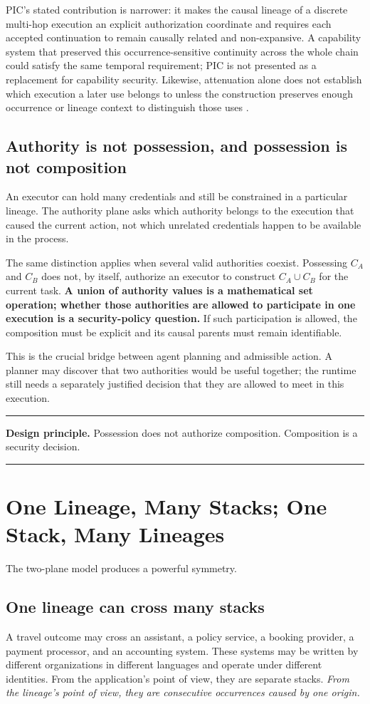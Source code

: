 \documentclass[10pt,oneside,openany]{book}
\newcommand{\principle}[1]{%
  \vspace{4pt}
  \noindent\begin{minipage}{\linewidth}
  \hrule\vspace{5pt}
  \small\sffamily\raggedright\textbf{Design principle.} #1
  \vspace{5pt}\hrule
  \end{minipage}\vspace{4pt}
}
\begin{document}
PIC's stated contribution is narrower: it makes the causal lineage of a discrete multi-hop execution an explicit authorization coordinate and requires each accepted continuation to remain causally related and non-expansive. A capability system that preserved this occurrence-sensitive continuity across the whole chain could satisfy the same temporal requirement; PIC is not presented as a replacement for capability security. Likewise, attenuation alone does not establish which execution a later use belongs to unless the construction preserves enough occurrence or lineage context to distinguish those uses \cite{gallo2026pic}.

\section{Authority is not possession, and possession is not composition}
An executor can hold many credentials and still be constrained in a particular lineage. The authority plane asks which authority belongs to the execution that caused the current action, not which unrelated credentials happen to be available in the process.

The same distinction applies when several valid authorities coexist. Possessing $C_A$ and $C_B$ does not, by itself, authorize an executor to construct $C_A \cup C_B$ for the current task. \textbf{A union of authority values is a mathematical set operation; whether those authorities are allowed to participate in one execution is a security-policy question.} If such participation is allowed, the composition must be explicit and its causal parents must remain identifiable.

This is the crucial bridge between agent planning and admissible action. A planner may discover that two authorities would be useful together; the runtime still needs a separately justified decision that they are allowed to meet in this execution.

\principle{Possession does not authorize composition. Composition is a security decision.}

\chapter{One Lineage, Many Stacks; One Stack, Many Lineages}

The two-plane model produces a powerful symmetry.

\section{One lineage can cross many stacks}
A travel outcome may cross an assistant, a policy service, a booking provider, a payment processor, and an accounting system. These systems may be written by different organizations in different languages and operate under different identities. From the application's point of view, they are separate stacks. \emph{From the lineage's point of view, they are consecutive occurrences caused by one origin.}
\end{document}
